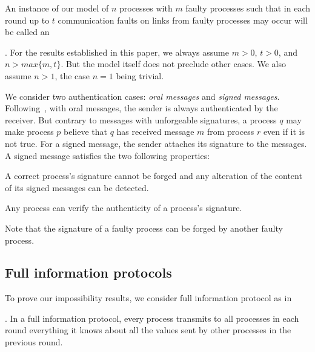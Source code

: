 An instance of our model of $n$ processes with $m$ 
faulty processes such that in each round up to $t$ communication faults
on links from faulty processes may occur will be called an {. For the results established in this paper, we always assume $m>0$, $t>0$, and $n > 
max\{m,t\}$. But the model itself does not preclude other cases. We also assume $n>1$, the case $n=1$ being trivial. 

\vspace{1em}
 We consider two authentication cases:
 \emph{oral messages} and \emph{signed messages}.
Following~\cite{lamport1982byzantine,srikanth1987optimal}, with oral messages, the
sender is always
authenticated by the receiver. But contrary to messages with
unforgeable signatures, a process $q$ may make process $p$ believe that $q$ has received
message $m$ from process $r$ even if it is not true.
For a signed message,  the sender attaches its
signature to the messages. 
A signed message satisfies the two following properties: 

\begin{enumeratealpha}
  \item A correct process's signature cannot be
    forged and any alteration of the content of its signed messages
    can be detected. 
  \item Any process can verify the authenticity of a process's
    signature. 
\end{enumeratealpha}
Note that the signature of a faulty process can be forged by
another faulty process. 

\subsection{Full information protocols}
To prove our impossibility results, we consider full information protocol as in 
{\cite{fischer1982lower,lamport1982byzantine,lynch1996distributed}. In a full information
protocol, every process transmits to all processes in each round everything it knows
about all the values sent by other processes in the previous round.

}}
